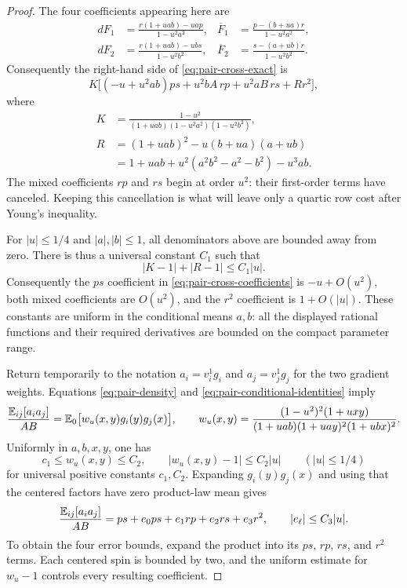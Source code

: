 \begin{proof}
The four coefficients appearing here are
\begin{align*}
 dF_1&=\frac{r(1+uab)-uap}{1-u^2a^2},&
 \overline F_1&=\frac{p-(b+ua)r}{1-u^2a^2},\\
 dF_2&=\frac{r(1+uab)-ubs}{1-u^2b^2},&
 \overline F_2&=\frac{s-(a+ub)r}{1-u^2b^2}.
\end{align*}
Consequently the right-hand side of \eqref{eq:pair-cross-exact} is
\begin{equation}
 K\bigl[(-u+u^2ab)ps+u^2bA\,rp+u^2aB\,rs+Rr^2\bigr],
 \label{eq:pair-cross-coefficients}
\end{equation}
where
\begin{align*}
 K&=\frac{1-u^2}{(1+uab)(1-u^2a^2)(1-u^2b^2)},\\
 R&=(1+uab)^2-u(b+ua)(a+ub)\\
  &=1+uab+u^2(a^2b^2-a^2-b^2)-u^3ab.
\end{align*}
The mixed coefficients $rp$ and $rs$ begin at order $u^2$: their
first-order terms have canceled. Keeping this cancellation is what will
leave only a quartic row cost after Young's inequality.

For $|u|\le1/4$ and $|a|,|b|\le1$, all denominators above are bounded
away from zero.  There is thus a universal constant $C_1$ such that
\[
 |K-1|+|R-1|\le C_1|u|.
\]
Consequently the $ps$ coefficient in \eqref{eq:pair-cross-coefficients}
is $-u+O(u^2)$, both mixed coefficients are $O(u^2)$, and the $r^2$
coefficient is $1+O(|u|)$. These constants are uniform in the conditional
means $a,b$: all the displayed rational functions and their required
derivatives are bounded on the compact parameter range.

Return temporarily to the notation $a_i=v_i^1g_i$ and $a_j=v_j^1g_j$ for
the two gradient weights.  Equations \eqref{eq:pair-density} and
\eqref{eq:pair-conditional-identities} imply
\begin{equation}
 \frac{\mathbb E_{ij}[a_i a_j]}{AB}
       =\mathbb E_0\bigl[w_u(x,y)g_i(y)g_j(x)\bigr],\qquad
 w_u(x,y)=\frac{(1-u^2)^2(1+uxy)}
 {(1+uab)(1+uay)^2(1+ubx)^2}.
 \label{eq:pair-gradient-product}
\end{equation}
Uniformly in $a,b,x,y$, one has
\[
 c_1\le w_u(x,y)\le C_2,\qquad
 |w_u(x,y)-1|\le C_2|u|\qquad (|u|\le1/4)
\]
for universal positive constants $c_1,C_2$.  Expanding
$g_i(y)g_j(x)$ and using that the centered factors have zero product-law
mean gives
\begin{equation}
 \frac{\mathbb E_{ij}[a_i a_j]}{AB}
       =ps+e_0ps+e_1rp+e_2rs+e_3r^2,
       \qquad |e_\ell|\le C_3|u|.
 \label{eq:pair-gradient-coefficients}
\end{equation}
To obtain the four error bounds, expand the product into its $ps$,
$rp$, $rs$, and $r^2$ terms. Each centered spin is bounded by two, and
the uniform estimate for $w_u-1$ controls every resulting coefficient.


\end{proof}
